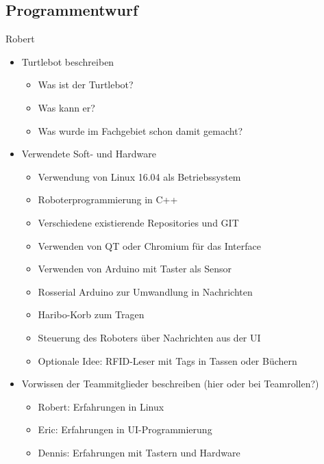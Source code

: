 \documentclass[a4paper,12pt,headsepline,toc=flat]{scrartcl}
\begin{document}
	\subsection{Programmentwurf}
		Robert\\
		\begin{itemize}
			\item Turtlebot beschreiben
			\begin{itemize}
				\item Was ist der Turtlebot?
				\item Was kann er?
				\item Was wurde im Fachgebiet schon damit gemacht?
			\end{itemize}
			
			\item Verwendete Soft- und Hardware
			\begin{itemize}
				\item Verwendung von Linux 16.04 als Betriebssystem
				\item Roboterprogrammierung in C++
				\item Verschiedene existierende Repositories und GIT
				\item Verwenden von QT oder Chromium für das Interface
				\item Verwenden von Arduino mit Taster als Sensor
				\item Rosserial Arduino zur Umwandlung in Nachrichten
				\item Haribo-Korb zum Tragen
				\item Steuerung des Roboters über Nachrichten aus der UI
				\item Optionale Idee: RFID-Leser mit Tags in Tassen oder Büchern
			\end{itemize}
			
			\item Vorwissen der Teammitglieder beschreiben (hier oder bei Teamrollen?)
			\begin{itemize}
				\item Robert: Erfahrungen in Linux
				\item Eric: Erfahrungen in UI-Programmierung
				\item Dennis: Erfahrungen mit Tastern und Hardware
			\end{itemize}
		\end{itemize}
\end{document}
